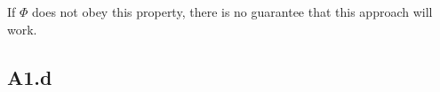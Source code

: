 \documentclass{article}
\begin{document}
If $\Phi$ does not obey this property, there is no guarantee that this approach will work.
	










\subsection*{A1.d}
\end{document}
